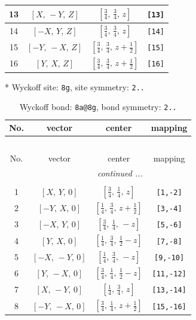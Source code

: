 \documentclass[fleqn,8pt]{jsarticle}
\begin{document}
\begin{longtable}{cccc}
13 & $\left[ X,\, - Y,\, Z \right]$ & $\left[ \frac{3}{4},\, \frac{3}{4},\, z \right]$ & {\tt [13]} \\ \hline
14 & $\left[ - X,\, Y,\, Z \right]$ & $\left[ \frac{3}{4},\, \frac{3}{4},\, z \right]$ & {\tt [14]} \\ \hline
15 & $\left[ - Y,\, - X,\, Z \right]$ & $\left[ \frac{3}{4},\, \frac{3}{4},\, z + \frac{1}{2} \right]$ & {\tt [15]} \\ \hline
16 & $\left[ Y,\, X,\, Z \right]$ & $\left[ \frac{3}{4},\, \frac{3}{4},\, z + \frac{1}{2} \right]$ & {\tt [16]} \\
\end{longtable}
* Wyckoff site: {\tt 8g}, site symmetry: {\tt 2..}
\renewcommand{\arraystretch}{1.2}
\begin{longtable}{cccc}
\caption{Wyckoff bond: {\tt 8a@8g}, bond symmetry: {\tt 2..}}
 \\
 \hline \hline
No. & vector & center & mapping \\ \hline \endfirsthead

\multicolumn{3}{l}{\tablename\ \thetable{}} \\
 \hline \hline
No. & vector & center & mapping \\ \hline \endhead

 \hline \hline
\multicolumn{3}{r}{\footnotesize\it continued ...} \\ \endfoot

 \hline \hline
\multicolumn{3}{r}{} \\ \endlastfoot

1 & $\left[ X,\, Y,\, 0 \right]$ & $\left[ \frac{3}{4},\, \frac{1}{4},\, z \right]$ & {\tt [1,-2]} \\ \hline
2 & $\left[ - Y,\, X,\, 0 \right]$ & $\left[ \frac{1}{4},\, \frac{3}{4},\, z + \frac{1}{2} \right]$ & {\tt [3,-4]} \\ \hline
3 & $\left[ - X,\, Y,\, 0 \right]$ & $\left[ \frac{3}{4},\, \frac{1}{4},\, - z \right]$ & {\tt [5,-6]} \\ \hline
4 & $\left[ Y,\, X,\, 0 \right]$ & $\left[ \frac{1}{4},\, \frac{3}{4},\, \frac{1}{2} - z \right]$ & {\tt [7,-8]} \\ \hline
5 & $\left[ - X,\, - Y,\, 0 \right]$ & $\left[ \frac{1}{4},\, \frac{3}{4},\, - z \right]$ & {\tt [9,-10]} \\ \hline
6 & $\left[ Y,\, - X,\, 0 \right]$ & $\left[ \frac{3}{4},\, \frac{1}{4},\, \frac{1}{2} - z \right]$ & {\tt [11,-12]} \\ \hline
7 & $\left[ X,\, - Y,\, 0 \right]$ & $\left[ \frac{1}{4},\, \frac{3}{4},\, z \right]$ & {\tt [13,-14]} \\ \hline
8 & $\left[ - Y,\, - X,\, 0 \right]$ & $\left[ \frac{3}{4},\, \frac{1}{4},\, z + \frac{1}{2} \right]$ & {\tt [15,-16]} \\
\end{longtable}
\end{document}
